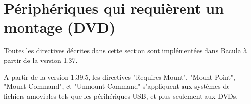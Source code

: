 \section{P\'eriph\'eriques qui requi\`erent un montage (DVD)}

Toutes les directives d\'ecrites dans cette section sont impl\'ement\'ees dans Bacula 
\`a partir de la version 1.37.

A partir de la version 1.39.5, les directives "Requires Mount", "Mount Point", 
"Mount Command", et "Unmount Command" s'appliquent aux syst\`emes de fichiers 
amovibles tels que les p\'erih\'eriques USB, et plus seulement aux DVDs.


